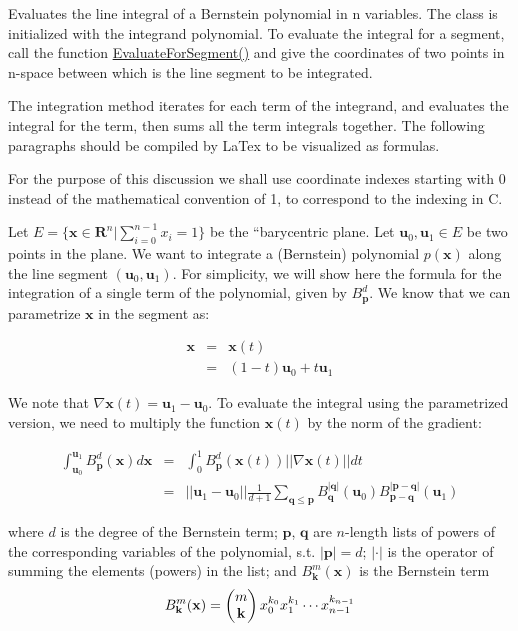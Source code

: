 Evaluates the line integral of a Bernstein polynomial in n variables. The class is initialized with the integrand polynomial. To evaluate the integral for a segment, call the function \hyperlink{classnmr_bernstein_polynomial_line_integral_aa0715104b8922688ed16042b410f7d82}{Evaluate\+For\+Segment()} and give the coordinates of two points in n-\/space between which is the line segment to be integrated.

The integration method iterates for each term of the integrand, and evaluates the integral for the term, then sums all the term integrals together. The following paragraphs should be compiled by La\+Tex to be visualized as formulas.

For the purpose of this discussion we shall use coordinate indexes starting with 0 instead of the mathematical convention of 1, to correspond to the indexing in C.

Let $ E = \{\mathbf{x} \in \mathbf{R}^n | \sum_{i=0}^{n-1} x_i = 1\} $ be the ``barycentric\textquotesingle{}\textquotesingle{} plane. Let $ \mathbf{u}_0, \mathbf{u}_1 \in E $ be two points in the plane. We want to integrate a (Bernstein) polynomial $ p(\mathbf{x}) $ along the line segment $ (\mathbf{u}_0, \mathbf{u}_1) $. For simplicity, we will show here the formula for the integration of a single term of the polynomial, given by $ B_{\mathbf{p}}^{d} $. We know that we can parametrize $ \mathbf{x} $ in the segment as\+:

\begin{eqnarray*} \mathbf{x} & = & \mathbf{x}(t) \\ & = & (1-t)\mathbf{u}_0 + t\mathbf{u}_1 \end{eqnarray*}

We note that $\nabla \mathbf{x}(t) = \mathbf{u}_1 - \mathbf{u}_0$. To evaluate the integral using the parametrized version, we need to multiply the function $\mathbf{x}(t)$ by the norm of the gradient\+:

\begin{eqnarray*} \int_{\mathbf{u}_0}^{\mathbf{u}_1} B_{\mathbf{p}}^{d}(\mathbf{x}) d\mathbf{x} & = & \int_{0}^{1} B_{\mathbf{p}}^{d} (\mathbf{x}(t)) || \nabla \mathbf{x}(t) || dt \\ & = & ||\mathbf{u}_1 - \mathbf{u}_0 || \frac{1}{d+1} \sum_{\mathbf{q} \leq \mathbf{p}} B_{\mathbf{q}}^{|\mathbf{q}|} (\mathbf{u}_0) B_{\mathbf{p} - \mathbf{q}}^{|\mathbf{p} - \mathbf{q}|} (\mathbf{u}_1) \end{eqnarray*}

where $d$ is the degree of the Bernstein term; $\mathbf{p}$, $\mathbf{q}$ are $n$-\/length lists of powers of the corresponding variables of the polynomial, s.\+t. $|\mathbf{p}| = d$; $|\cdot|$ is the operator of summing the elements (powers) in the list; and $B_{\mathbf{k}}^m(\mathbf{x})$ is the Bernstein term \[ B_\mathbf{k}^m(\mathbf{x}) = \left( \begin{array}{@{}c@{}} m \\ \mathbf{k} \end{array} \right) x_0^{k_0} x_1^{k_1} \cdots x_{n-1}^{k_{n-1}} \]

